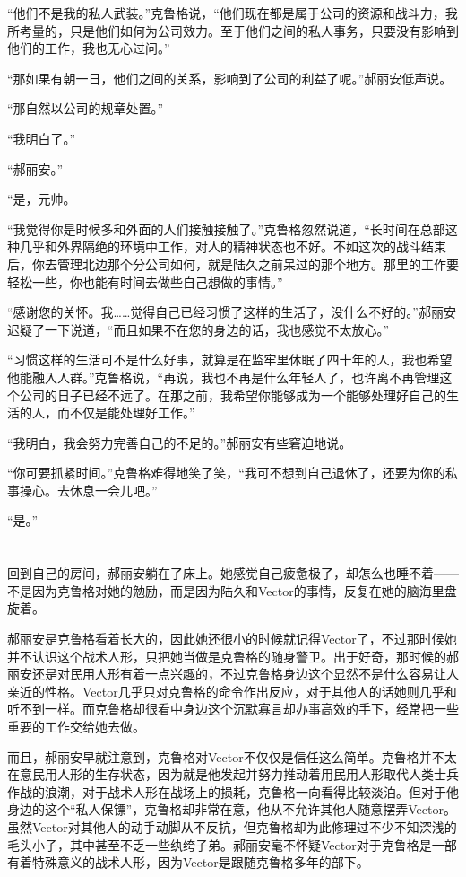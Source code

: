 “他们不是我的私人武装。”克鲁格说，“他们现在都是属于公司的资源和战斗力，我所考量的，只是他们如何为公司效力。至于他们之间的私人事务，只要没有影响到他们的工作，我也无心过问。”

“那如果有朝一日，他们之间的关系，影响到了公司的利益了呢。”郝丽安低声说。

“那自然以公司的规章处置。”

“我明白了。”

“郝丽安。”

“是，元帅。

“我觉得你是时候多和外面的人们接触接触了。”克鲁格忽然说道，“长时间在总部这种几乎和外界隔绝的环境中工作，对人的精神状态也不好。不如这次的战斗结束后，你去管理北边那个分公司如何，就是陆久之前呆过的那个地方。那里的工作要轻松一些，你也能有时间去做些自己想做的事情。”

“感谢您的关怀。我……觉得自己已经习惯了这样的生活了，没什么不好的。”郝丽安迟疑了一下说道，“而且如果不在您的身边的话，我也感觉不太放心。”

“习惯这样的生活可不是什么好事，就算是在监牢里休眠了四十年的人，我也希望他能融入人群。”克鲁格说，“再说，我也不再是什么年轻人了，也许离不再管理这个公司的日子已经不远了。在那之前，我希望你能够成为一个能够处理好自己的生活的人，而不仅是能处理好工作。”

“我明白，我会努力完善自己的不足的。”郝丽安有些窘迫地说。

“你可要抓紧时间。”克鲁格难得地笑了笑，“我可不想到自己退休了，还要为你的私事操心。去休息一会儿吧。”

“是。”

\section*{}

回到自己的房间，郝丽安躺在了床上。她感觉自己疲惫极了，却怎么也睡不着——不是因为克鲁格对她的勉励，而是因为陆久和Vector的事情，反复在她的脑海里盘旋着。

郝丽安是克鲁格看着长大的，因此她还很小的时候就记得Vector了，不过那时候她并不认识这个战术人形，只把她当做是克鲁格的随身警卫。出于好奇，那时候的郝丽安还是对民用人形有着一点兴趣的，不过克鲁格身边这个显然不是什么容易让人亲近的性格。Vector几乎只对克鲁格的命令作出反应，对于其他人的话她则几乎和听不到一样。而克鲁格却很看中身边这个沉默寡言却办事高效的手下，经常把一些重要的工作交给她去做。

而且，郝丽安早就注意到，克鲁格对Vector不仅仅是信任这么简单。克鲁格并不太在意民用人形的生存状态，因为就是他发起并努力推动着用民用人形取代人类士兵作战的浪潮，对于战术人形在战场上的损耗，克鲁格一向看得比较淡泊。但对于他身边的这个“私人保镖”，克鲁格却非常在意，他从不允许其他人随意摆弄Vector。虽然Vector对其他人的动手动脚从不反抗，但克鲁格却为此修理过不少不知深浅的毛头小子，其中甚至不乏一些纨绔子弟。郝丽安毫不怀疑Vector对于克鲁格是一部有着特殊意义的战术人形，因为Vector是跟随克鲁格多年的部下。

